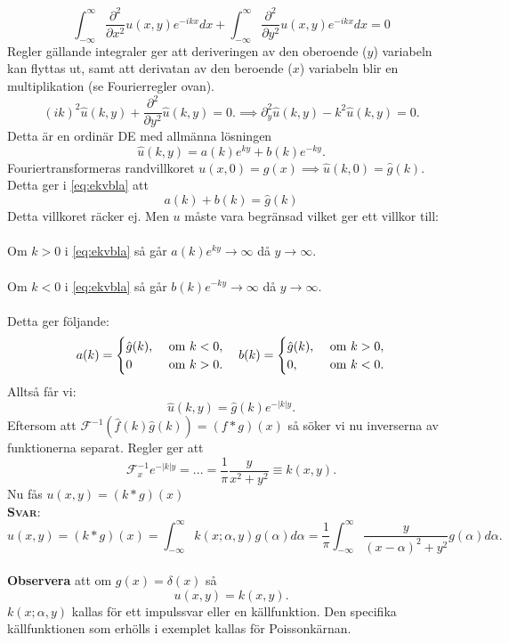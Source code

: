 \documentclass{article}
\begin{document}
$$
\int_{-\infty}^{\infty}\frac{\partial^2}{\partial x^2}u(x,y)e^{-ikx}dx+\int_{-\infty}^{\infty}\frac{\partial^2}{\partial y^2}u(x,y)e^{-ikx}dx=0
$$
Regler gällande integraler ger att deriveringen av den oberoende ($y$) variabeln kan flyttas ut, samt att derivatan av den beroende ($x$) variabeln blir en multiplikation (se Fourierregler ovan).
$$
(ik)^2\hat{u}(k,y)+\frac{\partial^2}{\partial y^2}\hat{u}(k,y)=0.\implies \partial_y^2\hat{u}(k,y)-k^2\hat{u}(k,y)=0.
$$
Detta är en ordinär DE med allmänna lösningen
\begin{equation}\label{eq:ekvbla}
    \hat{u}(k,y)=a(k)e^{ky}+b(k)e^{-ky}.
\end{equation}
Fouriertransformeras randvillkoret $u(x,0)=g(x)\implies\hat{u}(k,0)=\hat{g}(k)$. Detta ger i \eqref{eq:ekvbla} att
$$
a(k)+b(k)=\hat{g}(k)
$$
Detta villkoret räcker ej. Men $u$ måste vara begränsad vilket ger ett villkor till:\\ \\
Om $k>0$ i \eqref{eq:ekvbla} så går $a(k)e^{ky}\longrightarrow\infty$ då $y\longrightarrow\infty$.\\ \\
Om $k<0$ i \eqref{eq:ekvbla} så går $b(k)e^{-ky}\longrightarrow\infty$ då $y\longrightarrow\infty$.\\ \\
Detta ger följande:
\begin{equation}
    a(k)=\begin{cases}
            \hat{g}(k), \ &$om$ \ k<0,\\
            0 \ &$om$ \ k>0.
        \end{cases}\quad
    b(k)=\begin{cases}
            \hat{g}(k), \ &$om$ \ k>0,\\
            0, \ &$om$ \ k<0.
        \end{cases}
\end{equation}
Alltså får vi:
$$
\hat{u}(k,y)=\hat{g}(k)e^{-|k|y}.
$$
Eftersom att $\mathcal{F}^{-1}(\hat{f}(k)\hat{g}(k))=(f*g)(x)$ så söker vi nu inverserna av funktionerna separat. Regler ger att
$$
\mathcal{F}_x^{-1}e^{-|k|y}=...=\frac{1}{\pi}\frac{y}{x^2+y^2}\equiv k(x,y).
$$
Nu fås $u(x,y)=(k*g)(x)$\\
\textbf{\textsc{Svar}}:
$$
u(x,y)=(k*g)(x)=\int_{-\infty}^{\infty}k(x;\alpha,y)g(\alpha)d\alpha=\frac{1}{\pi}\int_{-\infty}^{\infty}\frac{y}{(x-\alpha)^2 +y^2}g(\alpha)d\alpha.
$$\\

\textbf{Observera} att om $g(x)=\delta(x)$ så
$$
u(x,y)=k(x,y).
$$
$k(x;\alpha,y)$ kallas för ett impulssvar eller en källfunktion. Den specifika källfunktionen som erhölls i exemplet kallas för Poissonkärnan. 
\end{document}
